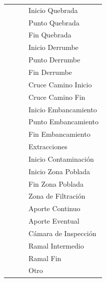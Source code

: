 \documentclass[]{article}
\begin{document}
\begin{longtable}{|p{3cm}|p{3.5cm}|p{3.5cm}|p{3.5cm}|}
    & & & Inicio Quebrada\\ \cline{4-4}
    & & & Punto Quebrada\\ \cline{4-4}
    & & & Fin Quebrada\\ \cline{4-4}
    & & & Inicio Derrumbe\\ \cline{4-4}
    & & & Punto Derrumbe\\ \cline{4-4}
    & & & Fin Derrumbe\\ \cline{4-4}
    & & & Cruce Camino Inicio\\ \cline{4-4}
    & & & Cruce Camino Fin\\ \cline{4-4}
    & & & Inicio Embancamiento\\ \cline{4-4}
    & & & Punto Embancamiento\\ \cline{4-4}
    & & & Fin Embancamiento\\ \cline{4-4}
    & & & Extracciones\\ \cline{4-4}
    & & & Inicio Contaminación\\ \cline{4-4}
    & & & Inicio Zona Poblada\\ \cline{4-4}
    & & & Fin Zona Poblada\\ \cline{4-4}
    & & & Zona de Filtración\\ \cline{4-4}
    & & & Aporte Continuo\\ \cline{4-4}
    & & & Aporte Eventual\\ \cline{4-4}
    & & & Cámara de Inspección\\ \cline{4-4}
    & & & Ramal Intermedio\\ \cline{4-4}
    & & & Ramal Fin\\ \cline{4-4}
    & & & Otro\\ \cline{2-4}
    \end{longtable}
\end{document}
